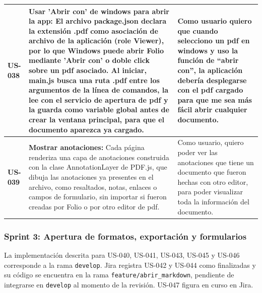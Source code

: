 \begin{longtable}{|l||p{7cm}|p{4.5cm}|}
\hline
\textbf{US-038} & \textbf{Usar 'Abrir con' de windows para abrir la app:} El archivo package.json declara la extensión .pdf como asociación de archivo de la aplicación (role Viewer), por lo que Windows puede abrir Folio mediante 'Abrir con' o doble click sobre un pdf asociado. Al iniciar, main.js busca una ruta .pdf entre los argumentos de la línea de comandos, la lee con el servicio de apertura de pdf y la guarda como variable global antes de crear la ventana principal, para que el documento aparezca ya cargado. & Como usuario quiero que cuando selecciono un pdf en windows y uso la función de “abrir con”, la aplicación debería desplegarse con el pdf cargado para que me sea más fácil abrir cualquier documento.\\
\hline
\textbf{US-039} & \textbf{Mostrar anotaciones:} Cada página renderiza una capa de anotaciones construida con la clase AnnotationLayer de PDF.js, que dibuja las anotaciones ya presentes en el archivo, como resaltados, notas, enlaces o campos de formulario, sin importar si fueron creadas por Folio o por otro editor de pdf. & Como usuario, quiero poder ver las anotaciones que tiene un documento que fueron hechas con otro editor, para poder visualizar toda la información del documento.\\
\hline

\end{longtable}

\subsubsection{Sprint 3: Apertura de formatos, exportación y formularios}

La implementación descrita para US-040, US-041, US-043, US-045 y US-046 corresponde a la rama \texttt{develop}. Jira registra US-042 y US-044 como finalizadas y su código se encuentra en la rama \texttt{feature/abrir\_markdown}, pendiente de integrarse en \texttt{develop} al momento de la revisión. US-047 figura en curso en Jira.

